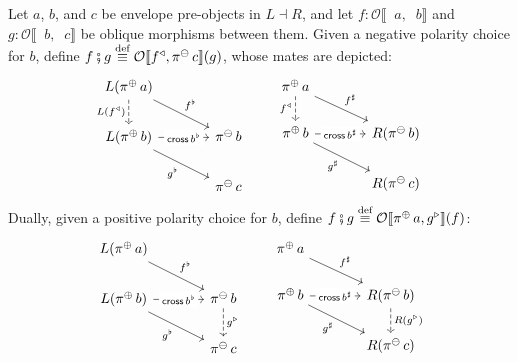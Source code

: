 \documentclass[runningheads]{llncs}
\newcommand*\rocqlogo{\usebox{\rocqlogobox}}
\newcommand{\lemmaref}[3]{\href{https://github.com/UniMath/UniMath/blob/94fae0eda57a778cec704bfa73b4ff525c9bc475/#1\#L#2?name=#3}{\rocqlogo}}
\newcommand{\acat}[1]{\mathcal{#1}}
\newcommand{\OO}{\acat{O}}
\newcommand{\dcomp}{\fatsemi}
\newcommand{\morsof}[3]{{#1}\llbracket{#2},{#3}\rrbracket}
\newcommand{\defequiv}{\overset{\mathrm{\textup{def}}}{\equiv}}
\newcommand{\projneg}{\mathop{\pi^{\ominus}}}
\newcommand{\projpos}{\mathop{\pi^{\oplus}}}
\newcommand{\crossmor}{\mathop{\mathsf{cross}}}
\newcommand{\pullR}[1]{{#1}^{\triangleright}}
\newcommand{\pullL}[1]{{#1}^{\triangleleft}}
\begin{document}
\begin{definition}[{\lemmaref{UniMath/CategoryTheory/Nonassociative/Duploids/FromAdjunction/Envelope.v}{189}{envelope\_compose'}}]
\label{def:envelope-compose-choice}
Let \(a\), \(b\), and
\(c\) be envelope pre\hyp{}objects in \(L \dashv R\), and let \(f :
\morsof\OO{\projpos{a}}{\projneg{b}}\) and \(g :
\morsof\OO{\projpos{b}}{\projneg{c}}\) be oblique morphisms between
them. Given a negative polarity choice for \(b\), define \(f \dcomp g
\defequiv \morsof\OO{\pullL{f}}{\projneg c}(g)\), whose mates are depicted:
\begin{equation}
\begin{tikzcd}[column sep=large, ampersand replacement=\&]
  {L(\projpos a)} \& \\
  {L(\projpos b)} \& {\projneg b} \\
  \& {\projneg c}
  \arrow["{f^\flat}", from=1-1, to=2-2]
  \arrow["{\crossmor b^\flat}"{description}, from=2-1, to=2-2]
  \arrow["{g^\flat}"', from=2-1, to=3-2]
  \arrow["{L(\pullL{f})}"', dashed, from=1-1, to=2-1]
\end{tikzcd}
\qquad
\begin{tikzcd}[column sep=large, ampersand replacement=\&]
  {\projpos a} \& \\
  {\projpos b} \& {R(\projneg b)} \\
  \& {R(\projneg c)}
  \arrow["{f^\sharp}", from=1-1, to=2-2]
  \arrow["{\crossmor b^\sharp}"{description}, from=2-1, to=2-2]
  \arrow["{g^\sharp}"', from=2-1, to=3-2]
  \arrow["{\pullL{f}}"', dashed, from=1-1, to=2-1]
\end{tikzcd} \label{dia:envelope-comp-negative}
\end{equation}
Dually, given a positive
polarity choice for \(b\), define \(f \dcomp g \defequiv
\morsof\OO{\projpos a}{\pullR{g}}(f)\):
\begin{equation}
\begin{tikzcd}[column sep=large, ampersand replacement=\&]
{L(\projpos a)} \& \\
{L(\projpos b)} \& {\projneg b} \\
\& {\projneg c}
\arrow["{f^\flat}", from=1-1, to=2-2]
\arrow["{\crossmor b^\flat}"{description}, from=2-1, to=2-2]
\arrow["{g^\flat}"', from=2-1, to=3-2]
\arrow["{\pullR{g}}", dashed, from=2-2, to=3-2]
\end{tikzcd} \qquad \begin{tikzcd}[column sep=large, ampersand replacement=\&]
{\projpos a} \& \\
{\projpos b} \& {R(\projneg b)} \\
\& {R(\projneg c)}
\arrow["{f^\sharp}", from=1-1, to=2-2]
\arrow["{\crossmor b^\sharp}"{description}, from=2-1, to=2-2]
\arrow["{g^\sharp}"', from=2-1, to=3-2]
\arrow["{R(\pullR{g})}", dashed, from=2-2, to=3-2]
\end{tikzcd} \label{dia:envelope-comp-positive}
\end{equation}
\end{definition}
\end{document}
